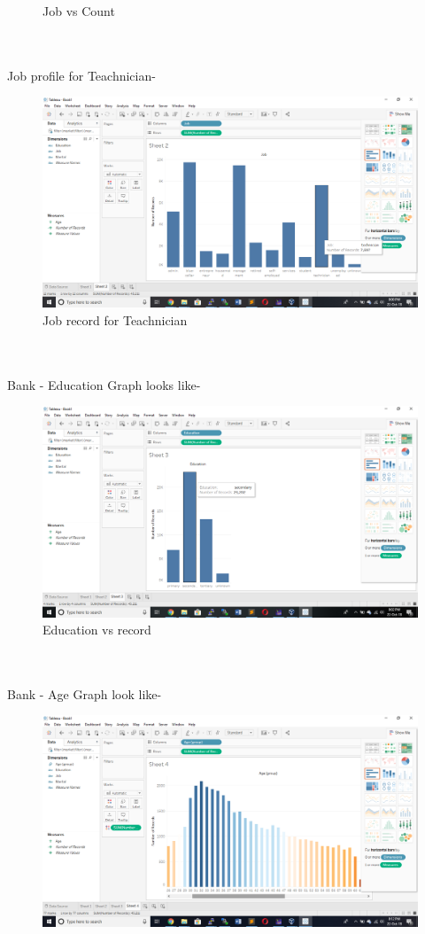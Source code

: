\begin{itemize}
\begin{figure}[h!]
	\caption{Job vs Count}
\end{figure}
\\
\\
Job profile for Teachnician-
\begin{figure}[h!]
	\centering
	\includegraphics[width=\linewidth]{sc7.png}
	\caption{Job record for Teachnician }
\end{figure}
\\
\\
Bank - Education Graph looks like-
\begin{figure}[h!]
	\centering
	\includegraphics[width=\linewidth]{sc8.png}
	\caption{Education vs record}
\end{figure}
\\
\\
%
Bank - Age Graph look like- 
\begin{figure}[h!]
	\centering
	\includegraphics[width=\linewidth]{sc9.png}

\end{figure}
\end{itemize}
